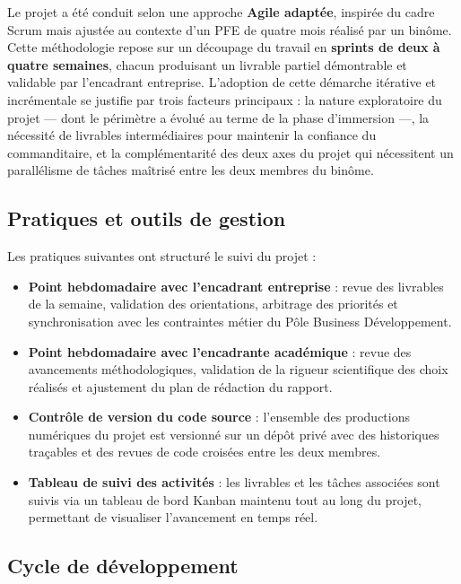 \documentclass[12pt,a4paper]{report}
\begin{document}
Le projet a été conduit selon une approche \textbf{Agile adaptée}, inspirée du cadre Scrum mais ajustée au contexte d'un PFE de quatre mois réalisé par un binôme. Cette méthodologie repose sur un découpage du travail en \textbf{sprints de deux à quatre semaines}, chacun produisant un livrable partiel démontrable et validable par l'encadrant entreprise. L'adoption de cette démarche itérative et incrémentale se justifie par trois facteurs principaux : la nature exploratoire du projet --- dont le périmètre a évolué au terme de la phase d'immersion ---, la nécessité de livrables intermédiaires pour maintenir la confiance du commanditaire, et la complémentarité des deux axes du projet qui nécessitent un parallélisme de tâches maîtrisé entre les deux membres du binôme.

\subsection{Pratiques et outils de gestion}

Les pratiques suivantes ont structuré le suivi du projet :

\begin{itemize}[leftmargin=1.5cm, itemsep=4pt]
  \item \textbf{Point hebdomadaire avec l'encadrant entreprise} : revue des livrables de la semaine, validation des orientations, arbitrage des priorités et synchronisation avec les contraintes métier du Pôle Business Développement.
  \item \textbf{Point hebdomadaire avec l'encadrante académique} : revue des avancements méthodologiques, validation de la rigueur scientifique des choix réalisés et ajustement du plan de rédaction du rapport.
  
  \item \textbf{Contrôle de version du code source} : l'ensemble des productions numériques du projet est versionné sur un dépôt privé avec des historiques traçables et des revues de code croisées entre les deux membres.
  \item \textbf{Tableau de suivi des activités} : les livrables et les tâches associées sont suivis via un tableau de bord Kanban maintenu tout au long du projet, permettant de visualiser l'avancement en temps réel.
\end{itemize}

\subsection{Cycle de développement}
\end{document}
